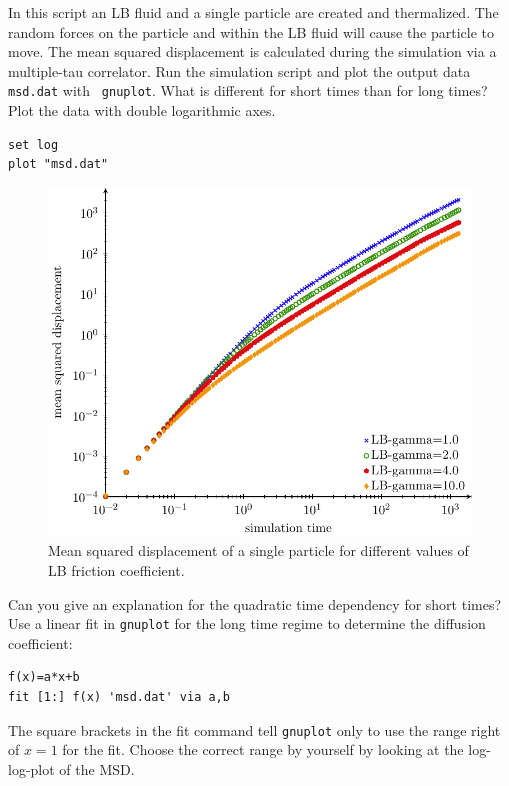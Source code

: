 In this script an LB fluid and a single particle are created and
thermalized. 
The random forces on the particle and
within the LB fluid will cause the particle to move. The mean squared
displacement is calculated during the simulation via a multiple-tau correlator. 
Run the simulation script and plot the output data {\tt msd.dat} with {\tt
gnuplot}.
What is different for short times than for long times?
Plot the data with double logarithmic axes.
{\vspace{0,2cm}\small
\begin{lstlisting}[numbers=none]
set log
plot "msd.dat"
\end{lstlisting}\vspace{0,2cm}
}
\begin{figure}[h]
  \begin{center}
	  \includegraphics{figures/diffusion/msd.pdf}
  \end{center}
  \caption{Mean squared displacement of a single particle for different values
  of LB friction coefficient.}
\end{figure}

Can you give an explanation for the quadratic time dependency for short
times?
Use a linear fit in {\tt gnuplot} for the long time regime to determine the 
diffusion coefficient:
{\vspace{0,2cm}\small
\begin{lstlisting}[numbers=none]
f(x)=a*x+b
fit [1:] f(x) 'msd.dat' via a,b
\end{lstlisting}\vspace{0,2cm}
}
The square brackets in the fit command tell \lstinline{gnuplot}
only to use the range right of $x=1$ for the fit. Choose the correct range by
yourself by looking at the log-log-plot of the MSD.


